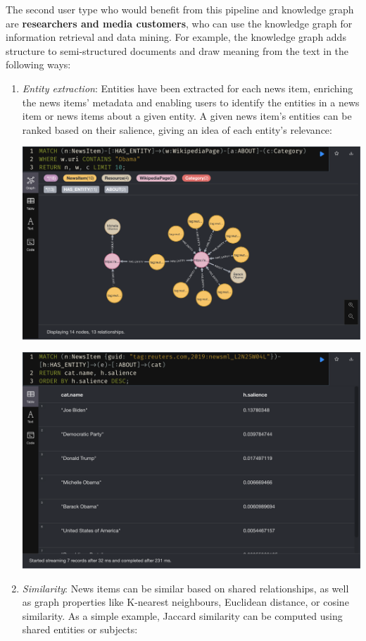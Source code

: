 \documentclass[11pt]{article}
\begin{document}
The second user type who would benefit from this pipeline and knowledge graph are \textbf{researchers and media customers}, who can use the knowledge graph for information retrieval and data mining. For example, the knowledge graph adds structure to semi-structured documents and draw meaning from the text in the following ways:
\begin{enumerate}
  \item{
    \textit{Entity extraction}: Entities have been extracted for each news item, enriching the news items' metadata and enabling users to identify the entities in a news item or news items about a given entity. A given news item's entities can be ranked based on their salience, giving an idea of each entity's relevance:

    \centerline{\includegraphics[scale=0.3]{use-case-3a}}
    \centerline{\includegraphics[scale=0.3]{use-case-3b}}

  }
  \item{
    \textit{Similarity}: News items can be similar based on shared relationships, as well as graph properties like K-nearest neighbours, Euclidean distance, or cosine similarity. As a simple example, Jaccard similarity can be computed using shared entities or subjects:

}
\end{enumerate}
\end{document}
